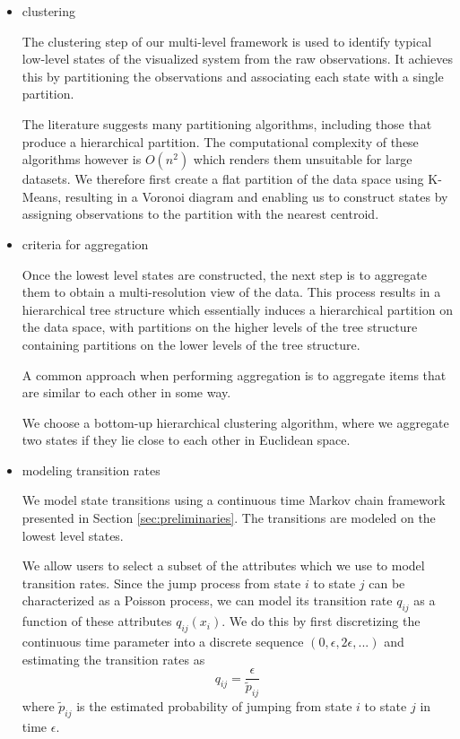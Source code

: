 \begin{itemize}
	\item clustering
	
	The clustering step of our multi-level framework is used to identify typical low-level states
	of the visualized system from the raw observations. It achieves this by partitioning the
	observations and associating each state with a single partition.
	
	The literature suggests many partitioning algorithms, including those that produce a hierarchical 
	partition. The computational complexity of these algorithms however is $O(n^2)$ which renders 
	them unsuitable for large datasets. We therefore first create a flat partition of the data space
	using K-Means, resulting in a Voronoi diagram and enabling us to construct states by assigning
	observations to the partition with the nearest centroid.
	
	\item criteria for aggregation 
	
	Once the lowest level states are constructed, the next step is to aggregate them to obtain a
	multi-resolution view of the data. This process results in a hierarchical tree structure
	which essentially induces a hierarchical partition on the data space, with partitions
	on the higher levels of the tree structure containing partitions on the lower levels of the
	tree structure.
	
	 A common approach when performing aggregation is to aggregate
	items that are similar to each other in some way.
	
	We choose a bottom-up hierarchical clustering algorithm,
	where we aggregate two states if they lie close to each other in Euclidean space.
	
	\item modeling transition rates
	
	We model state transitions using a continuous time Markov chain framework presented in Section
	\ref{sec:preliminaries}. The transitions are modeled on the lowest level states.
	
	We allow users to select a subset of the attributes which we use to model transition rates.
	Since the jump process from state $i$ to state $j$ can be characterized as a Poisson process,
	we can model its transition rate $q_{ij}$ as a function of these attributes $q_{ij}(x_i)$.
	We do this by first discretizing the continuous time parameter into a discrete sequence
	$(0, \epsilon, 2\epsilon, ...)$ and estimating the transition rates as
	\begin{equation}
		q_{ij} = \frac{\epsilon}{\tilde{p}_{ij}}
	\end{equation}
	where $\tilde{p}_{ij}$ is the estimated probability of jumping from state $i$ to state $j$
	in time $\epsilon$.
	

\end{itemize}
